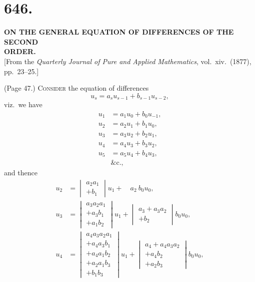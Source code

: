 \documentclass[11pt,a4paper]{article}
\begin{document}
\section*{646.}

\begin{center}
\textbf{ON THE GENERAL EQUATION OF DIFFERENCES OF THE SECOND\\ORDER.}\\[1em]
[From the \textit{Quarterly Journal of Pure and Applied Mathematics}, vol.~xiv.\ (1877), pp.\ 23--25.]
\end{center}

\medskip

\noindent (Page 47.) \textsc{Consider} the equation of differences
\[
u_s = a_s u_{s-1} + b_{s-1} u_{s-2},
\]
viz.\ we have
\begin{align*}
u_1 &= a_1 u_0 + b_0 u_{-1}, \\
u_2 &= a_2 u_1 + b_1 u_0, \\
u_3 &= a_3 u_2 + b_2 u_1, \\
u_4 &= a_4 u_3 + b_3 u_2, \\
u_5 &= a_5 u_4 + b_4 u_3, \\
&\&\text{c.,}
\end{align*}
and thence
\begin{align*}
u_2 &= \begin{vmatrix} a_2 a_1 \\ + b_1 \end{vmatrix} u_1 + \quad a_2 \ b_0 u_0,\\[2pt]
u_3 &= \begin{vmatrix} a_3 a_2 a_1 \\ + a_3 b_1 \\ + a_1 b_2 \end{vmatrix} u_1 + \begin{vmatrix} a_3 + a_3 a_2 \\ + b_2 \end{vmatrix} b_0 u_0,\\[2pt]
u_4 &= \begin{vmatrix} a_4 a_3 a_2 a_1 \\ + a_4 a_3 b_1 \\ + a_4 a_1 b_2 \\ + a_2 a_1 b_3 \\ + b_1 b_3 \end{vmatrix} u_1 + \begin{vmatrix} a_4 + a_4 a_3 a_2 \\ + a_4 b_2 \\ + a_2 b_3 \end{vmatrix} b_0 u_0,
\end{align*}
\end{document}

